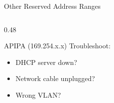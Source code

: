 \documentclass[aspectratio=169]{beamer}  %
\begin{document}
\begin{frame}{Other Reserved Address Ranges}
\begin{columns}[T]
\begin{column}{0.48\textwidth}
\begin{alertblock}{APIPA (169.254.x.x)}
                \vspace{0.3em}
                Troubleshoot:
                \begin{itemize}
                    \item DHCP server down?
                    \item Network cable unplugged?
                    \item Wrong VLAN?
                \end{itemize}
            \end{alertblock}
        \end{column}
    \end{columns}
\end{frame}

\end{document}
